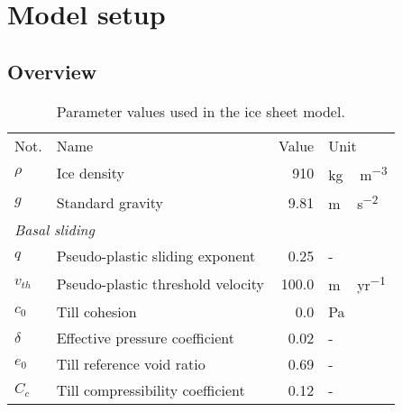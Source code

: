 \documentclass[tc, manuscript]{copernicus}
\begin{document}
\section{Model setup}
\label{sec:model}

\subsection{Overview}
\label{sec:overview}

\begin{table*}
  \centering
  \caption{Parameter values used in the ice sheet model.}
  \label{tab:params}
  {\begin{tabular}{llrl}
    \tophline
    Not.    & Name & Value & Unit \\
    \middlehline

    $\rho$  & Ice density
            & 910
            & \unit{kg\,m^{-3}} \\

    $g$     & Standard gravity
            & 9.81
            & \unit{m\,s^{-2}} \\

    \multicolumn{2}{l}{\emph{Basal sliding}} \\

    $q$     & Pseudo-plastic sliding exponent
            & 0.25
            & - \\

    $v_{th}$& Pseudo-plastic threshold velocity
            & 100.0
            & \unit{m\,yr^{-1}} \\

    $c_0$   & Till cohesion
            & 0.0
            & Pa \\

    $\delta$& Effective pressure coefficient
            & 0.02
            & - \\

    $e_0$   & Till reference void ratio
            & 0.69
            & - \\

    $C_c$   & Till compressibility coefficient
            & 0.12
            & - \\


\end{tabular}}
\end{table*}
\end{document}
